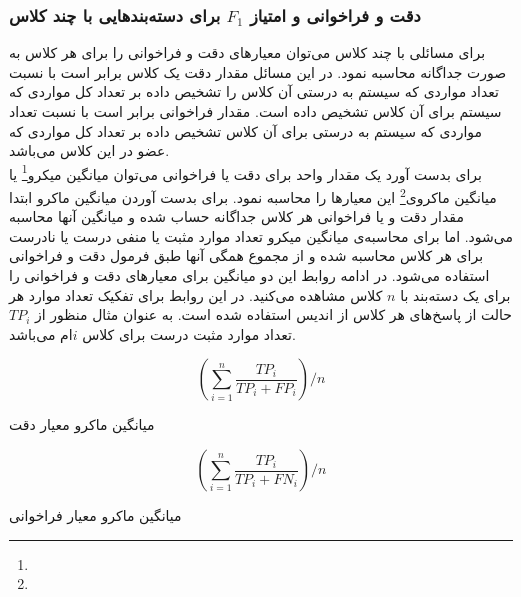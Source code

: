 \subsubsection{دقت و فراخوانی و امتیاز $F_{1}$ برای دسته‌بندهایی با چند کلاس}
برای مسائلی با چند کلاس می‌توان معیارهای دقت و فراخوانی را برای هر کلاس به صورت جداگانه محاسبه نمود. در این مسائل مقدار دقت یک کلاس برابر است با نسبت تعداد مواردی که سیستم به درستی آن کلاس را تشخیص داده بر تعداد کل مواردی که سیستم برای آن کلاس تشخیص داده است. مقدار فراخوانی برابر است با نسبت تعداد مواردی که سیستم به درستی برای آن کلاس تشخیص داده بر تعداد کل مواردی که عضو در این کلاس می‌باشد.\\
برای بدست آورد یک مقدار واحد برای دقت یا فراخوانی می‌توان میانگین میکرو\footnote{} یا میانگین ماکروی\footnote{} این معیارها را محاسبه نمود.
برای بدست آوردن میانگین ماکرو ابتدا مقدار دقت و یا فراخوانی هر کلاس جداگانه حساب شده و میانگین آنها محاسبه می‌شود.
اما برای محاسبه‌ی میانگین میکرو تعداد موارد مثبت یا منفی درست یا نادرست برای هر کلاس محاسبه شده و از مجموع همگی آنها طبق فرمول دقت و فراخوانی استفاده می‌شود. در ادامه روابط این دو میانگین برای معیار‌های دقت و فراخوانی را برای یک دسته‌بند با $n$ کلاس مشاهده می‌کنید. در این روابط برای تفکیک تعداد موارد هر حالت از پاسخ‌های هر کلاس از اندیس استفاده شده است. به عنوان مثال منظور از $TP_i$ تعداد موارد مثبت درست برای کلاس $i$ام می‌باشد.
\begin{center}
	\begin{minipage}[b]{.45\textwidth}
		\begin{equation}
		\label{eqn:precision_macro}
		(\sum_{i = 1}^{n} \frac{TP_i}{TP_i + FP_i}) / n
		\end{equation}
		\centerline{\small{میانگین ماکرو معیار دقت}}
	\end{minipage}
	\quad
	\begin{minipage}[b]{.45\textwidth}
		\begin{equation}
		\label{eqn:recall_macro}
		(\sum_{i = 1}^{n} \frac{TP_i}{TP_i + FN_i}) / n
		\end{equation}
		\centerline{\small{میانگین ماکرو معیار فراخوانی}}
	\end{minipage}
\end{center}

